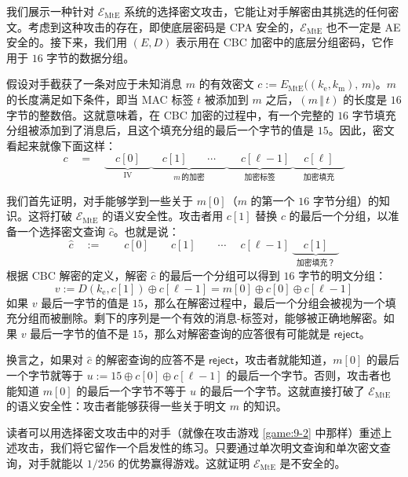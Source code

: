 \begin{snote}[选择密文攻击。]
我们展示一种针对 $\mathcal{E}_\mathrm{MtE}$ 系统的选择密文攻击，它能让对手解密由其挑选的任何密文。考虑到这种攻击的存在，即使底层密码是 CPA 安全的，$\mathcal{E}_\mathrm{MtE}$ 也不一定是 AE 安全的。接下来，我们用 $(E,D)$ 表示用在 CBC 加密中的底层分组密码，它作用于 $16$ 字节的数据分组。

假设对手截获了一条对应于未知消息 $m$ 的有效密文 $c:=E_\mathrm{MtE}\big((k_\mathrm{e},k_\mathrm{m}),\,m)$。$m$ 的长度满足如下条件，即当 MAC 标签 $t$ 被添加到 $m$ 之后，$(m\,\Vert\,t)$ 的长度是 $16$ 字节的整数倍。这就意味着，在 CBC 加密的过程中，有一个完整的 $16$ 字节填充分组被添加到了消息后，且这个填充分组的最后一个字节的值是 $15$。因此，密文看起来就像下面这样：
\[
	c\quad = \quad
	\underbrace{\boxed{\quad c[0]\quad}}_{\text{IV}}\!
	\underbrace{\boxed{\quad c[1]\quad}\;\;\;\cdots\quad}_{m\,\text{的加密}}
	\underbrace{\quad\boxed{\; c[\ell-1]\;}}_{\text{加密标签}}\!
	\underbrace{\boxed{\quad c[\ell]\quad}}_{\text{加密填充}}
\]

我们首先证明，对手能够学到一些关于 $m[0]$（$m$ 的第一个 $16$ 字节分组）的知识。这将打破 $\mathcal{E}_\mathrm{MtE}$ 的语义安全性。攻击者用 $c[1]$ 替换 $c$ 的最后一个分组，以准备一个选择密文查询 $\hat{c}$。也就是说：
\begin{equation}\label{eq:9-9}
\hat{c}\quad := \quad
\boxed{\quad c[0]\quad}
\boxed{\quad c[1]\quad}
\quad\cdots\quad
\boxed{\; c[\ell-1]\;}\!
\underbrace{\boxed{\quad c[1]\quad}}_{\text{加密填充？}}
\end{equation}
根据 CBC 解密的定义，解密 $\hat{c}$ 的最后一个分组可以得到 $16$ 字节的明文分组：
\[
v:=D\left(k_\mathrm{e},c[1]\right)\oplus c[\ell-1]=m[0]\oplus c[0]\oplus c[\ell-1]
\]
如果 $v$ 最后一字节的值是 $15$，那么在解密过程中，最后一个分组会被视为一个填充分组而被删除。剩下的序列是一个有效的消息-标签对，能够被正确地解密。如果 $v$ 最后一字节的值不是 $15$，那么对解密查询的应答很有可能就是 $\mathsf{reject}$。

换言之，如果对 $\hat{c}$ 的解密查询的应答不是 $\mathsf{reject}$，攻击者就能知道，$m[0]$ 的最后一个字节就等于 $u:=15\oplus c[0]\oplus c[\ell-1]$ 的最后一个字节。否则，攻击者也能知道 $m[0]$ 的最后一个字节不等于 $u$ 的最后一个字节。这就直接打破了 $\mathcal{E}_\mathrm{MtE}$ 的语义安全性：攻击者能够获得一些关于明文 $m$ 的知识。

读者可以用选择密文攻击中的对手（就像在攻击游戏 \ref{game:9-2} 中那样）重述上述攻击，我们将它留作一个启发性的练习。只要通过单次明文查询和单次密文查询，对手就能以 $1/256$ 的优势赢得游戏。这就证明 $\mathcal{E}_\mathrm{MtE}$ 是不安全的。


\end{snote}
